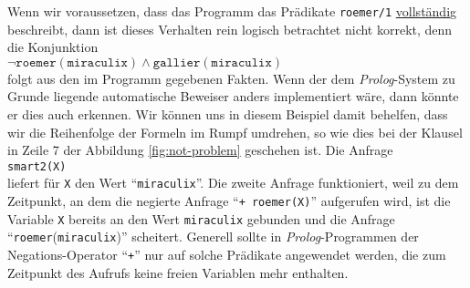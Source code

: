 Wenn wir voraussetzen, dass das Programm das Pr\"{a}dikate \texttt{roemer/1}
\underline{vollst\"{a}ndi}g beschreibt, dann ist dieses Verhalten rein logisch betrachtet nicht korrekt,
denn die Konjunktion \\[0.1cm]
\hspace*{1.3cm} 
$\neg \mathtt{roemer}(\mathtt{miraculix}) \wedge \mathtt{gallier}(\mathtt{miraculix})$
 \\[0.1cm]
folgt aus den im Programm gegebenen Fakten.  Wenn der dem \textsl{Prolog}-System zu Grunde liegende
automatische Beweiser anders implementiert w\"{a}re, dann k\"{o}nnte er dies auch erkennen.
Wir k\"{o}nnen uns in diesem Beispiel damit behelfen, dass wir die Reihenfolge der
Formeln im Rumpf umdrehen, so wie dies bei der Klausel in Zeile 7 der Abbildung
\ref{fig:not-problem} geschehen ist.  Die Anfrage \\[0.1cm]
\hspace*{1.3cm} \texttt{smart2(X)} \\[0.1cm]
liefert f\"{u}r \texttt{X} den Wert ``\texttt{miraculix}''.
Die zweite Anfrage funktioniert, weil zu dem Zeitpunkt, an dem die negierte Anfrage
``\texttt{+ roemer(X)}'' aufgerufen wird, ist die Variable \texttt{X} bereits
an den Wert \texttt{miraculix} gebunden und die Anfrage ``\texttt{roemer}(\texttt{miraculix})''
scheitert.  Generell sollte in \textsl{Prolog}-Programmen der Negations-Operator
``\texttt{+}'' nur auf solche Pr\"{a}dikate angewendet werden, die zum Zeitpunkt
des Aufrufs keine freien Variablen mehr enthalten.


